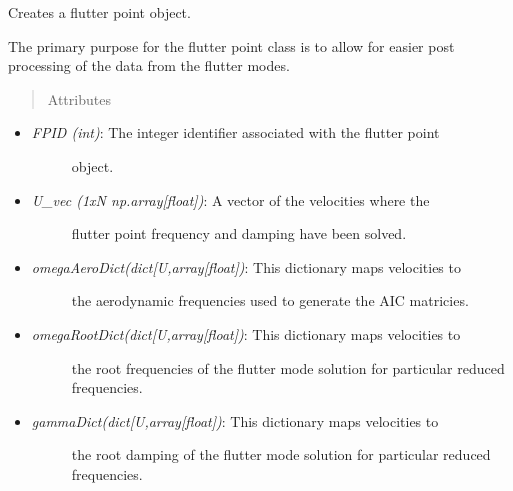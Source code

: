 \documentclass[letterpaper,10pt,english]{sphinxmanual}
\begin{document}
\begin{fulllineitems}
\label{FEM:AeroComBAT.FEM.FlutterPoint}
Creates a flutter point object.

The primary purpose for the flutter point class is to allow for easier
post processing of the data from the flutter modes.
\begin{quote}\begin{description}
\item[{Attributes}] \leavevmode
\end{description}\end{quote}
\begin{itemize}
\item {} \begin{description}
\item[{\emph{FPID (int)}: The integer identifier associated with the flutter point}] \leavevmode
object.

\end{description}

\item {} \begin{description}
\item[{\emph{U\_vec (1xN np.array{[}float{]})}: A vector of the velocities where the}] \leavevmode
flutter point frequency and damping have been solved.

\end{description}

\item {} \begin{description}
\item[{\emph{omegaAeroDict(dict{[}U,array{[}float{]})}: This dictionary maps velocities to}] \leavevmode
the aerodynamic frequencies used to generate the AIC matricies.

\end{description}

\item {} \begin{description}
\item[{\emph{omegaRootDict(dict{[}U,array{[}float{]})}: This dictionary maps velocities to}] \leavevmode
the root frequencies of the flutter mode solution for particular
reduced frequencies.

\end{description}

\item {} \begin{description}
\item[{\emph{gammaDict(dict{[}U,array{[}float{]})}: This dictionary maps velocities to}] \leavevmode
the root damping of the flutter mode solution for particular
reduced frequencies.


\end{description}
\end{itemize}
\end{fulllineitems}
\end{document}
